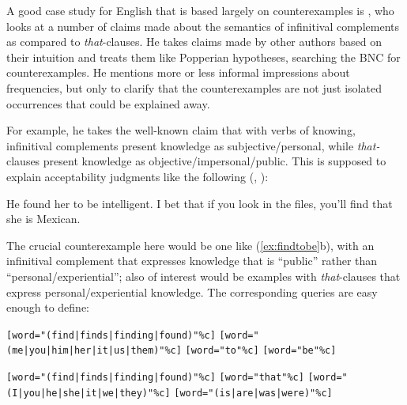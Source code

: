 A good case study for English that is based largely on counterexamples  is \citet{rohdenburg_is_2003}, who looks at a number of claims made about the semantics  of infinitival complements  as compared to \textit{that}-clauses. He takes claims made by other authors based on their intuition  and treats them like Popperian hypotheses, searching the BNC  for counterexamples. He mentions more or less informal impressions about frequencies, but only to clarify that the counterexamples  are not just isolated occurrences that could be explained away.

For example, he takes the well\hyp{}known claim that with verbs  of knowing, infinitival complements  present knowledge as subjective\slash personal, while \textit{that-}clauses present knowledge as objective\slash impersonal\slash public. This is supposed to explain acceptability  judgments like the following (\citealt[45--46]{corum_be_1973}, \citealt[50, 136]{wierzbicka_semantics_1988}):

\begin{exe}
\ex
\begin{xlist}
\label{ex:findtobe}
\ex He found her to be intelligent.
\ex I bet that if you look in the files, you'll find that she is Mexican.
\end{xlist}
\end{exe}

The crucial counterexample  here would be one like (\ref{ex:findtobe}b), with an infinitival complement  that expresses knowledge that is ``public'' rather than ``personal\slash experiential''; also of interest would be examples with \textit{that}-clauses that express personal\slash experiential knowledge. The corresponding queries are easy enough to define:

\begin{exe}
\ex
\begin{xlist}
\label{ex:findtobequery}
\ex \begin{minipage}[t]{0.85\textwidth} \raggedright \texttt{[word="(find|\allowbreak finds|\allowbreak finding|\allowbreak found)"\%c]} \texttt{[word="(me|\allowbreak you|\allowbreak him|\allowbreak her|\allowbreak it|\allowbreak us|\allowbreak them)"\%c]} \texttt{[word="to"\%c]} \texttt{[word="be"\%c]} \end{minipage}
\ex \begin{minipage}[t]{0.85\textwidth} \raggedright \texttt{[word="(find|\allowbreak finds|\allowbreak finding|\allowbreak found)"\%c]} \texttt{[word="that"\%c]} \texttt{[word="(I|\allowbreak you|\allowbreak he|\allowbreak she|\allowbreak it|\allowbreak we|\allowbreak they)"\%c]} \texttt{[word="(is|\allowbreak are|\allowbreak was|\allowbreak were)"\%c]} \end{minipage}
\end{xlist}
\end{exe}

